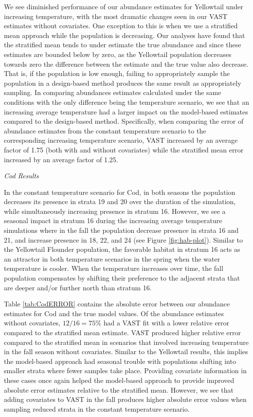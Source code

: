 \documentclass[
  12pt,
]{article}
\begin{document}
We see diminished performance of our abundance estimates for Yellowtail under increasing temperature, with the most dramatic changes seen in our VAST estimates without covariates. One exception to this is when we use a stratified mean approach while the population is decreasing. Our analyses have found that the stratified mean tends to under estimate the true abundance and since these estimates are bounded below by zero, as the Yellowtail population decreases towards zero the difference between the estimate and the true value also decrease. That is, if the population is low enough, failing to appropriately sample the population in a design-based method produces the same result as appropriately sampling. In comparing abundances estimates calculated under the same conditions with the only difference being the temperature scenario, we see that an increasing average temperature had a larger impact on the model-based estimates compared to the design-based method. Specifically, when comparing the error of abundance estimates from the constant temperature scenario to the corresponding increasing temperature scenario, VAST increased by an average factor of 1.75 (both with and without covariates) while the stratified mean error increased by an average factor of 1.25.

\emph{Cod Results}

In the constant temperature scenario for Cod, in both seasons the population decreases its presence in strata 19 and 20 over the duration of the simulation, while simultaneously increasing presence in stratum 16. However, we see a seasonal impact in stratum 16 during the increasing average temperature simulations where in the fall the population decrease presence in strata 16 and 21, and increase presence in 18, 22, and 24 (see Figure \ref{fig:hab-plot}). Similar to the Yellowtail Flounder population, the favorable habitat in stratum 16 acts as an attractor in both temperature scenarios in the spring when the water temperature is cooler. When the temperature increases over time, the fall population compensates by shifting their preference to the adjacent strata that are deeper and/or further north than stratum 16.

Table \ref{tab:CodERROR} contains the absolute error between our abundance estimates for Cod and the true model values. Of the abundance estimates without covariates, \(12/16=75\)\% had a VAST fit with a lower relative error compared to the stratified mean estimate. VAST produced higher relative error compared to the stratified mean in scenarios that involved increasing temperature in the fall season without covariates. Similar to the Yellowtail results, this implies the model-based approach had seasonal trouble with populations shifting into smaller strata where fewer samples take place. Providing covariate information in these cases once again helped the model-based approach to provide improved absolute error estimates relative to the stratified mean. However, we see that adding covariates to VAST in the fall produces higher absolute error values when sampling reduced strata in the constant temperature scenario.
\end{document}
